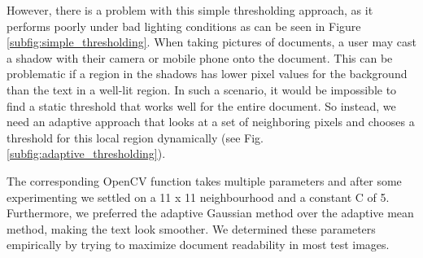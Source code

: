 \documentclass[bibliography=totoc]{scrartcl}
\begin{document}
However, there is a problem with this simple thresholding approach, as it performs poorly under bad lighting conditions as can be seen in Figure \ref{subfig:simple_thresholding}.
When taking pictures of documents, a user may cast a shadow with their camera or mobile phone onto the document.
This can be problematic if a region in the shadows has lower pixel values for the background than the text in a well-lit region.
In such a scenario, it would be impossible to find a static threshold that works well for the entire document.
So instead, we need an adaptive approach that looks at a set of neighboring pixels and chooses a threshold for this local region dynamically (see Fig. \ref{subfig:adaptive_thresholding}). \cite{Thresholding}

The corresponding OpenCV function takes multiple parameters and after some experimenting we settled on a 11 x 11 neighbourhood and a constant C of 5.
Furthermore, we preferred the adaptive Gaussian method over the adaptive mean method, making the text look smoother.
We determined these parameters empirically by trying to maximize document readability in most test images.
\end{document}
